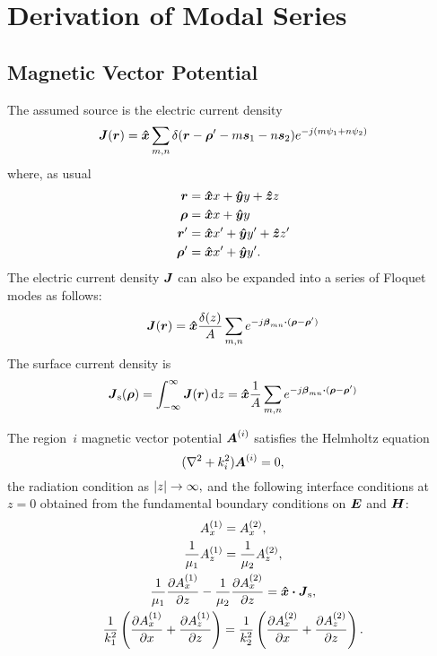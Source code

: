 \section{Derivation of Modal Series}
\subsection{Magnetic Vector Potential}

The assumed source is the electric current density
\begin{equation}
  \label{eq:J}
  \boldsymbol{J}(\boldsymbol{r}) = \boldsymbol{\hat{x}}  \sum_{m,n} 
  \delta(\boldsymbol{r}-\boldsymbol{\rho}'-m\boldsymbol{s}_1 -n\boldsymbol{s}_2) e^{-j(m\psi_1 + n\psi_2)}
\end{equation}
where, as usual
\begin{subequations}
  \begin{align}
    \boldsymbol{r} &= \boldsymbol{\hat{x}} x + \boldsymbol{\hat{y}} y + \boldsymbol{\hat{z}} z \\
    \boldsymbol{\rho} &= \boldsymbol{\hat{x}} x + \boldsymbol{\hat{y}} y \\
    \boldsymbol{r}' &= \boldsymbol{\hat{x}} x' + \boldsymbol{\hat{y}} y' + \boldsymbol{\hat{z}} z' \\
    \boldsymbol{\rho}' &= \boldsymbol{\hat{x}} x' + \boldsymbol{\hat{y}} y'. 
  \end{align}
\end{subequations}
The electric current density $\boldsymbol{J}$
can also be expanded into a series of Floquet modes as follows:
\begin{equation}
  \label{eq:Jfloquet}
  \boldsymbol{J}(\boldsymbol{r}) = 
  \boldsymbol{\hat{x}} \frac{\delta(z)}{A} \sum_{m,n} e^{-j\boldsymbol{\beta}_{mn} \boldsymbol{\cdot} (\boldsymbol{\rho}-\boldsymbol{\rho}')}
\end{equation}
The surface current density is 
\begin{equation}
  \boldsymbol{J}_{\text{s}}(\boldsymbol{\rho}) = \int_{-\infty}^{\infty} \boldsymbol{J}(\boldsymbol{r}) \, \text{d} z 
  = \boldsymbol{\hat{x}} \frac{1}{A} \sum_{m,n}  e^{-j\boldsymbol{\beta}_{mn} \boldsymbol{\cdot} (\boldsymbol{\rho}-\boldsymbol{\rho}')}
\end{equation}


The region~$i$ magnetic vector potential 
 $\boldsymbol{A}^{(i)}$ satisfies the Helmholtz equation
 \begin{equation}
   \label{eq:Ahelmholtz}
   (\nabla^2 + k_i^2) \boldsymbol{A}^{(i)} = 0,
 \end{equation}
the radiation condition as $\lvert z\rvert \rightarrow \infty,$
and the following interface conditions at $z=0$ obtained from the fundamental
boundary conditions on $\boldsymbol{E}$ and $\boldsymbol{H}$:
\begin{subequations}
  \begin{gather}
    A^{(1)}_x = A^{(2)}_x, \label{eq:Abc:a} \\
    \frac{1}{\mu_1} A^{(1)}_z = \frac{1}{\mu_2} A^{(2)}_z, \label{eq:Abc:b} \\
    \frac{1}{\mu_1}  \frac{\partial A^{(1)}_x}{\partial z} - \frac{1}{\mu_2} \frac{\partial A^{(2)}_x}{\partial z} 
    = \boldsymbol{\hat{x}} \boldsymbol{\cdot} \boldsymbol{J}_{\text{s}}, \label{eq:Abc:c} \\
    \frac{1}{k_1^2} 
    \left(
      \frac{\partial A^{(1)}_x}{\partial x} + \frac{\partial A^{(1)}_z}{\partial z}
    \right)
    =
    \frac{1}{k_2^2} 
    \left(
      \frac{\partial A^{(2)}_x}{\partial x} + \frac{\partial A^{(2)}_z}{\partial z}
    \right). \label{eq:Abc:d}
  \end{gather}
\end{subequations}

